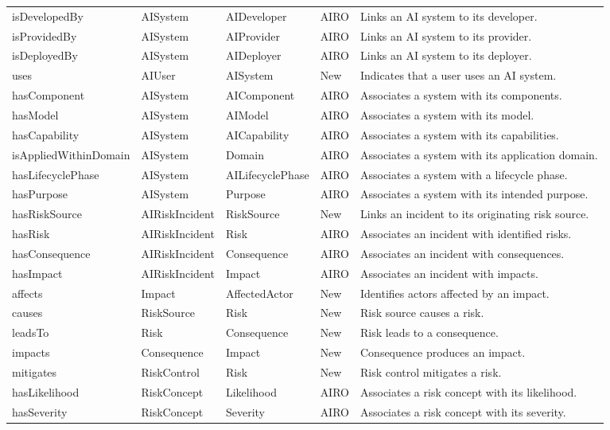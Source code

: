 \documentclass[a4paper,fleqn]{cas-dc}
\begin{document}
\begin{longtable}{>{\raggedright\arraybackslash}p{2.9cm}p{2.2cm}p{2.2cm}p{1.1cm}p{5.0cm}}
isDevelopedBy & AISystem & AIDeveloper & AIRO & Links an AI system to its developer. \\
isProvidedBy & AISystem & AIProvider & AIRO & Links an AI system to its provider. \\
isDeployedBy & AISystem & AIDeployer & AIRO & Links an AI system to its deployer. \\
uses & AIUser & AISystem & New & Indicates that a user uses an AI system. \\
hasComponent & AISystem & AIComponent & AIRO & Associates a system with its components. \\
hasModel & AISystem & AIModel & AIRO & Associates a system with its model. \\
hasCapability & AISystem & AICapability & AIRO & Associates a system with its capabilities. \\
isApplied\allowbreak WithinDomain & AISystem & Domain & AIRO & Associates a system with its application domain. \\
hasLifecyclePhase & AISystem & AILifecyclePhase & AIRO & Associates a system with a lifecycle phase. \\
hasPurpose & AISystem & Purpose & AIRO & Associates a system with its intended purpose. \\
hasRiskSource & AIRiskIncident & RiskSource & New & Links an incident to its originating risk source. \\
hasRisk & AIRiskIncident & Risk & AIRO & Associates an incident with identified risks. \\
hasConsequence & AIRiskIncident & Consequence & AIRO & Associates an incident with consequences. \\
hasImpact & AIRiskIncident & Impact & AIRO & Associates an incident with impacts. \\
affects & Impact & AffectedActor & New & Identifies actors affected by an impact. \\
causes & RiskSource & Risk & New & Risk source causes a risk. \\
leadsTo & Risk & Consequence & New & Risk leads to a consequence. \\
impacts & Consequence & Impact & New & Consequence produces an impact. \\
mitigates & RiskControl & Risk & New & Risk control mitigates a risk. \\
hasLikelihood & RiskConcept & Likelihood & AIRO & Associates a risk concept with its likelihood. \\
hasSeverity & RiskConcept & Severity & AIRO & Associates a risk concept with its severity. \\

\end{longtable}
\end{document}
